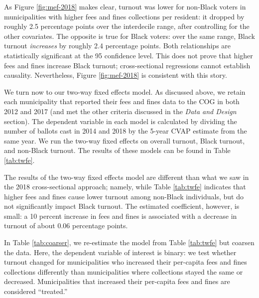 \documentclass[
  12pt,
]{article}
\begin{document}
As Figure \ref{fig:mef-2018} makes clear, turnout was lower for non-Black voters in municipalities with higher fees and fines collections per resident: it dropped by roughly 2.5 percentage points over the interdecile range, after controlling for the other covariates. The opposite is true for Black voters: over the same range, Black turnout \emph{increases} by roughly 2.4 percentage points. Both relationships are statistically significant at the 95 confidence level. This does not prove that higher fees and fines increase Black turnout; cross-sectional regressions cannot establish causality. Nevertheless, Figure \ref{fig:mef-2018} is consistent with this story.

We turn now to our two-way fixed effects model. As discussed above, we retain each municipality that reported their fees and fines data to the COG in both 2012 and 2017 (and met the other criteria discussed in the \emph{Data and Design} section). The dependent variable in each model is calculated by dividing the number of ballots cast in 2014 and 2018 by the 5-year CVAP estimate from the same year. We run the two-way fixed effects on overall turnout, Black turnout, and non-Black turnout. The results of these models can be found in Table \ref{tab:twfe}.

\begin{singlespace}

\end{singlespace}

The results of the two-way fixed effects model are different than what we saw in the 2018 cross-sectional approach; namely, while Table \ref{tab:twfe} indicates that higher fees and fines cause lower turnout among non-Black individuals, but do not significantly impact Black turnout. The estimated coefficient, however, is small: a 10 percent increase in fees and fines is associated with a decrease in turnout of about 0.06 percentage points.

In Table \ref{tab:coarser}, we re-estimate the model from Table \ref{tab:twfe} but coarsen the data. Here, the dependent variable of interest is binary: we test whether turnout changed for municipalities who increased their per-capita fees and fines collections differently than municipalities where collections stayed the same or decreased. Municipalities that increased their per-capita fees and fines are considered ``treated.''

\begin{singlespace}

\end{singlespace}
\end{document}
